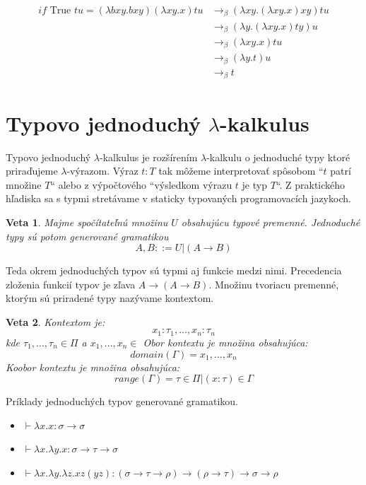 \documentclass[a4paper,10pt,oneside]{report}%
\newtheorem{theorem}{Veta}[chapter]
\begin{document}
\begin{align*}
    if \textrm{ True } t u = (\lambda bxy.bxy)(\lambda xy.x) t u & \to_{\beta} (\lambda xy.(\lambda xy.x)xy)tu \\
                                                     & \to_{\beta} (\lambda y.( \lambda xy.x)ty)u \\
                                                     & \to_{\beta} (\lambda xy.x)tu \\
                                                     & \to_{\beta} (\lambda y.t)u \\
                                                     & \to_{\beta} t
\end{align*}

\section{Typovo jednoduchý $\lambda$-kalkulus}
    Typovo jednoduchý $\lambda$-kalkulus je rozšírením $\lambda$-kalkulu o jednoduché typy ktoré
priraďujeme $\lambda$-výrazom.
    Výraz $t : T$ tak môžeme interpretovať spôsobom ``$t$ patrí množine $T$`` alebo
    z výpočtového ``výsledkom výrazu $t$ je typ $T$``. Z praktického hľadiska sa s typmi
stretávame v staticky typovaných programovacích jazykoch.
\begin{theorem}
    Majme spočítateľnú množinu $U$ obsahujúcu typové premenné. Jednoduché typy
    sú potom generované gramatikou
    \begin{equation*}
        A,B ::= U | (A \to B)
    \end{equation*}
\end{theorem}
    Teda okrem jednoduchých typov sú typmi aj funkcie medzi nimi.
    Precedencia zloženia funkcií typov je zľava $A \to ( A  \to B )$. 
    Množinu tvoriacu premenné, ktorým sú priradené typy nazývame kontextom.
\begin{theorem}
    Kontextom je:
    \begin{equation*}
        { x_{1} : \tau_{1}, \dots, x_{n} : \tau_{n} }
    \end{equation*}
    kde $\tau_{1}, \dots, \tau_{n} \in \Pi$ a $x_{1}, \dots , x_{n} \in$
    Obor kontextu je množina obsahujúca:
    \begin{equation*}
        domain(\Gamma) = { x_{1}, \dots, x_{n} }
    \end{equation*}
    Koobor kontextu je množina obsahujúca:
    \begin{equation*}
        range( \Gamma ) = { \tau \in \Pi  | (x : \tau ) \in \Gamma }
    \end{equation*}
\end{theorem}
    Príklady jednoduchých typov generované gramatikou.
\begin{itemize}
    \item $\vdash \lambda x.x : \sigma \to \sigma$
    \item $\vdash \lambda x. \lambda y.x : \sigma \to \tau \to \sigma$
    \item $\vdash \lambda x. \lambda y. \lambda z.x z (y z): (\sigma \to \tau \to \rho) \to (\rho \to \tau) \to \sigma \to \rho$
\end{itemize}
\end{document}
